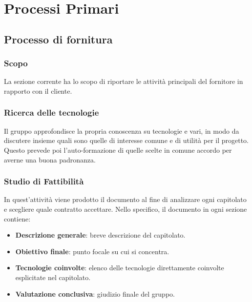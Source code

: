 \section{Processi Primari}\label{PP}

    \subsection{Processo di fornitura}\label{PP:Fornitura}	%

        \subsubsection{Scopo}\label{PP:Fornitura:Scopo}
		La sezione corrente ha lo scopo di riportare le  attività principali del fornitore in rapporto con il cliente.

		\subsubsection{Ricerca delle tecnologie}
		Il gruppo approfondisce la propria conoscenza su tecnologie e  vari, in modo da discutere insieme quali sono
		quelle di interesse comune e di utilità per il progetto. Questo prevede poi l'auto-formazione di quelle scelte in comune accordo per averne una buona padronanza.

        \subsubsection{Studio di Fattibilità}\label{PP:Fornitura:SdF}
        In quest'attività viene prodotto il documento  al fine di analizzare ogni capitolato e scegliere quale contratto accettare.
        Nello specifico, il documento in ogni sezione contiene:
        	\begin{itemize}
        		\item \textbf{Descrizione generale}: breve descrizione del capitolato.
        		\item \textbf{Obiettivo finale}: punto focale su cui si concentra.
        		\item \textbf{Tecnologie coinvolte}: elenco delle tecnologie direttamente coinvolte esplicitate nel capitolato.
        		\item \textbf{Valutazione conclusiva}: giudizio finale del gruppo.
        	\end{itemize}

